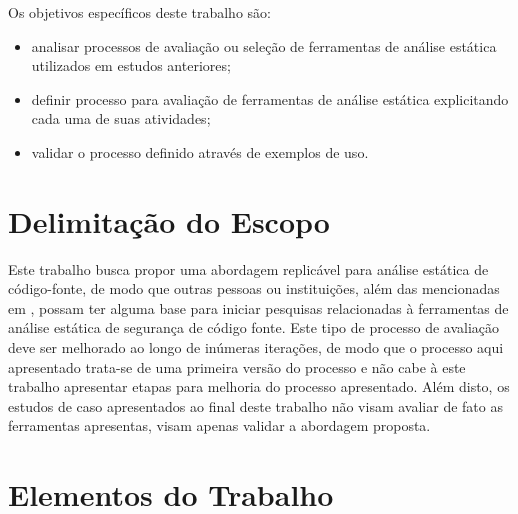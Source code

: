 Os objetivos específicos deste trabalho são:
\begin{itemize}
    \item analisar processos de avaliação ou seleção de ferramentas de análise estática utilizados em estudos anteriores;
    \item definir processo para avaliação de ferramentas de análise estática explicitando cada uma de suas atividades;
    \item validar o processo definido através de exemplos de uso.
\end{itemize}
\section*{Delimitação do Escopo}

Este trabalho busca propor uma abordagem replicável para análise estática de código-fonte, de modo que outras pessoas ou instituições, além das mencionadas em , possam ter alguma base para iniciar pesquisas relacionadas à ferramentas de análise estática de segurança de código fonte. Este tipo de processo de avaliação deve ser melhorado ao longo de inúmeras iterações, de modo que o processo aqui apresentado trata-se de uma primeira versão do processo e não cabe à este trabalho apresentar etapas para melhoria do processo apresentado. Além disto, os estudos de caso apresentados ao final deste trabalho não visam avaliar de fato as ferramentas apresentas, visam apenas validar a abordagem proposta.


\section*{Elementos do Trabalho}

